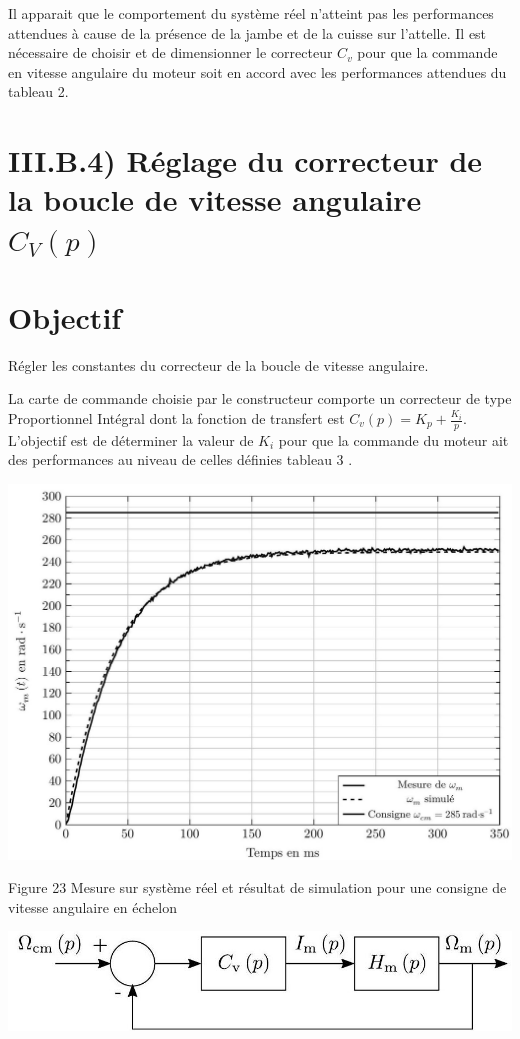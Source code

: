 \documentclass[10pt]{article}
\begin{document}
Il apparait que le comportement du système réel n'atteint pas les performances attendues à cause de la présence de la jambe et de la cuisse sur l'attelle. Il est nécessaire de choisir et de dimensionner le correcteur $C_{v}$ pour que la commande en vitesse angulaire du moteur soit en accord avec les performances attendues du tableau 2.

\section*{III.B.4) Réglage du correcteur de la boucle de vitesse angulaire $C_{V}(p)$}
\section*{Objectif}
Régler les constantes du correcteur de la boucle de vitesse angulaire.

La carte de commande choisie par le constructeur comporte un correcteur de type Proportionnel Intégral dont la fonction de transfert est $C_{v}(p)=K_{p}+\frac{K_{i}}{p}$. L'objectif est de déterminer la valeur de $K_{i}$ pour que la commande du moteur ait des performances au niveau de celles définies tableau 3 .

\begin{center}
\includegraphics[max width=\textwidth]{2024_07_14_a83aebba33898893d39fg-14(1)}
\end{center}

Figure 23 Mesure sur système réel et résultat de simulation pour une consigne de vitesse angulaire en échelon

\begin{center}
\includegraphics[max width=\textwidth]{2024_07_14_a83aebba33898893d39fg-14}
\end{center}
\end{document}
